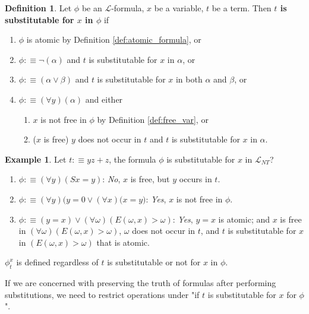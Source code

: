 \documentclass[11pt,letterpaper]{book}
\theoremstyle{definition}
\newtheorem{definition}{Definition}[section]
\newtheorem{example}{Example}[section]
\begin{document}
\begin{definition}\label{def:formula_sub_able}
Let $\phi$ be an $\mathcal{L}$-formula, $x$ be a variable, $t$ be a
term. Then \textbf{$t$ is substitutable for $x$ in $\phi$} if
\begin{enumerate}
\item{$\phi$ is atomic by Definition \ref{def:atomic_formula}, or}
\item{$\phi :\equiv \lnot (\alpha)$ and $t$ is substitutable for $x$ in
$\alpha$, or}
\item{$\phi :\equiv (\alpha \lor \beta)$ and $t$ is substitutable for
$x$ in both $\alpha$ and $\beta$, or}
\item{$\phi :\equiv (\forall y)(\alpha)$ and either}
\begin{enumerate}
\item{$x$ is not free in $\phi$ by Definition \ref{def:free_var}, or}
\item{($x$ is free) $y$ does not occur in $t$ and $t$ is substitutable
for $x$ in $\alpha$.}
\end{enumerate}

\end{enumerate}
\end{definition}

\begin{example}
Let $t:\equiv y z + z$, the formula $\phi$ is substitutable for $x$ in
$\mathcal{L}_{NT}$?
\begin{enumerate}
\item{$\phi :\equiv (\forall y) (Sx = y)$: \emph{No}, $x$ is free, but
$y$ occurs in $t$. }
\item{$\phi :\equiv (\forall y) \big(y=0 \lor (\forall x ) (x = y \big)
$: \emph{Yes}, $x$ is not free in $\phi$.}
\item{$\phi :\equiv (y=x) \lor (\forall \omega) (E(\omega,x) > \omega)
$: \emph{Yes}, $y=x$ is atomic; and $x$ is free in $(\forall \omega)
(E(\omega,x) > \omega)$, $\omega$ does not occur in $t$, and $t$ is
substitutable for $x$ in $ (E(\omega,x) > \omega)$ that is atomic. }
\end{enumerate}
\end{example}


$\phi_t ^x$ is defined regardless of $t$ is substitutable or not for $x$
in $\phi$.

If we are concerned with preserving the truth of formulas after
performing substitutions, we need to restrict operations under "if $t$
is substitutable for $x$ for $\phi$".
\end{document}
